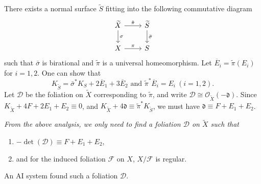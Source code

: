 \documentclass[reqno,oneside]{amsart}
\theoremstyle{definition}
\theoremstyle{plain}
\numberwithin{equation}{section}
\begin{document}
There exists a normal surface $\widetilde S$ fitting into the following commutative diagram \[
  \begin{tikzcd}
    \widetilde X \rar{\tilde{\pi}} \dar{\sigma} & \widetilde S\dar{\bar\sigma} \\
    X \rar{\pi} & S
  \end{tikzcd}
\]
such that $\bar\sigma$ is birational and $\tilde{\pi}$ is a universal homeomorphism.
Let $\overline E_i = \tilde{\pi}(E_i)$ for $i=1,2$.
One can show that \[
  K_{\widetilde S} = \bar\sigma^* K_S + 2 \overline E_1 + 3 \overline E_2
  \text{ \ and \ }
  \tilde{\pi}^* \overline E_i = E_i\ (i=1,2).
\]
Let $\mathcal D$ be the foliation on $\widetilde X$ corresponding to $\tilde{\pi}$, and write $\mathcal D\cong\mathcal O_{\widetilde X}(-\mathfrak d)$.
Since $K_{\widetilde X} + 4 F + 2 E_1 + E_2 \equiv 0$, and $K_{\widetilde X} + 4 \mathfrak d \equiv \tilde{\pi}^*K_{\widetilde S}$, 
we must have $\mathfrak d \equiv F + E_1 + E_2$.

{\it 
From the above analysis, we only need to find a foliation $\mathcal D$ on $\widetilde X$ such that 
\begin{enumerate}[\rm(1)]
  \item $-\det(\mathcal D) \equiv F+E_1+E_2$, 
  \item and for the induced foliation $\mathcal F$ on $X$, $X/\mathcal F$ is regular. 
\end{enumerate}
\medskip

An AI system found such a foliation $\mathcal D$.
}
\end{document}
